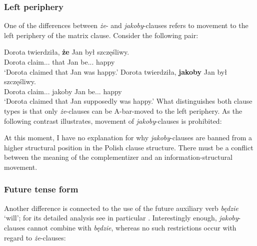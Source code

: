 \documentclass[output=paper]{langsci/langscibook}
\begin{document}
\subsubsection{Left periphery}
One of the differences between \emph{że}- and \emph{jakoby}-clauses refers to movement to the left periphery of the matrix clause. Consider the following pair:

\ea \ea \gll	Dorota twierdziła, \textbf{że} Jan był szczęśliwy. \\
		Dorota claim.{\lptcp}.{\sg}.{\fem} that Jan be.{\lptcp}.{\sg}.{\masc} happy \\
		\glt`Dorota claimed that Jan was happy.'
		\ex\gll		Dorota twierdziła, \textbf{jakoby} Jan był szczęśliwy. \\
			Dorota claim.{\lptcp}.{\sg}.{\fem} jakoby Jan be.{\lptcp}.{\sg}.{\masc} happy \\
		\glt`Dorota claimed that Jan supposedly was happy.'
\z\z
What distinguishes both clause types is that only \emph{że}-clauses can be A-bar-moved to the left periphery. As the following contrast illustrates, movement of \emph{jakoby}-clauses is prohibited:

\ea {}
    \z\z
At this moment, I have no explanation for why \emph{jakoby}-clauses are banned from a higher structural position in the Polish clause structure. There must be a conflict between the meaning of the complementizer and an information-structural movement.

\subsubsection{Future tense form}
Another difference is connected to the use of the future auxiliary verb \emph{będzie} `will'; for its detailed analysis see in particular \textcite{Baszczak-Jabonskaetal2014}. Interestingly enough, \emph{jakoby}-clauses cannot combine with \emph{będzie}, whereas no such restrictions occur with regard to \emph{że}-clauses:
\end{document}

